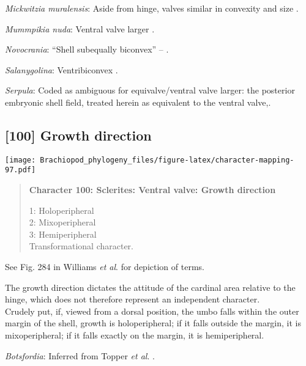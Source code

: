 \documentclass[openany]{book}
\theoremstyle{definition}
\theoremstyle{definition}
\theoremstyle{definition}
\theoremstyle{remark}
\begin{document}
\hypertarget{Mickwitzia_muralensis-coding-99}{}
\emph{Mickwitzia muralensis}: Aside from hinge, valves similar in
convexity and size \citep{Balthasar2008iMummpikia}.

\hypertarget{Mummpikia_nuda-coding-99}{}
\emph{Mummpikia nuda}: Ventral valve larger \citep[see][fig.
126.]{Williams2000LinguliformeaCraniiformea}.

\hypertarget{Novocrania-coding-99}{}
\emph{Novocrania}: ``Shell subequally biconvex'' --
\citet{Williams2000LinguliformeaCraniiformea}.

\hypertarget{Salanygolina-coding-99}{}
\emph{Salanygolina}: Ventribiconvex \citep{Popov2009Earlyontogeny}.

\hypertarget{Serpula-coding-99}{}
\emph{Serpula}: Coded as ambiguous for equivalve/ventral valve larger:
the posterior embryonic shell field, treated herein as equivalent to the
ventral valve,.

\subsection*{{[}100{]} Growth direction}\label{growth-direction-1}

\texttt{[image: Brachiopod\_phylogeny\_files/figure-latex/character-mapping-97.pdf]}

\begin{quote}
\textbf{Character 100: Sclerites: Ventral valve: Growth direction}

1: Holoperipheral\\
2: Mixoperipheral\\
3: Hemiperipheral\\
Transformational character.
\end{quote}

See Fig. 284 in Williams \emph{et al}.
\citeyearpar{Williams1997Introduction} for depiction of terms.

The growth direction dictates the attitude of the cardinal area relative
to the hinge, which does not therefore represent an independent
character.\\
Crudely put, if, viewed from a dorsal position, the umbo falls within
the outer margin of the shell, growth is holoperipheral; if it falls
outside the margin, it is mixoperipheral; if it falls exactly on the
margin, it is hemiperipheral.

\hypertarget{Botsfordia-coding-100}{}
\emph{Botsfordia}: Inferred from Topper \emph{et al}.
\citeyearpar{Topper2013Reappraisalof}.
\end{document}
